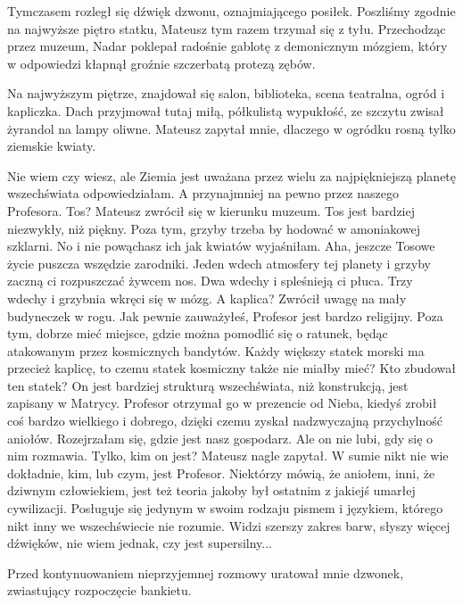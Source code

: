 Tymczasem rozległ się dźwięk dzwonu, oznajmiającego posiłek.
Poszliśmy zgodnie na najwyższe piętro statku, Mateusz tym razem trzymał się z tyłu.
Przechodząc przez muzeum, Nadar poklepał radośnie gablotę z demonicznym mózgiem, który w odpowiedzi kłapnął groźnie szczerbatą protezą zębów.

Na najwyższym piętrze, znajdował się salon, biblioteka, scena teatralna, ogród i kapliczka.
Dach przyjmował tutaj miłą, półkulistą wypukłość, ze szczytu zwisał żyrandol na lampy oliwne.
Mateusz zapytał mnie, dlaczego w ogródku rosną tylko ziemskie kwiaty.

\begin{dialogue}
\ds{} Nie wiem czy wiesz, ale Ziemia jest uważana przez wielu za najpiękniejszą planetę wszechświata \dm{} odpowiedziałam. \dm{}
A przynajmniej na pewno przez naszego Profesora.
\ds{} Tos? \dm{} Mateusz zwrócił się w kierunku muzeum.
\ds{} Tos jest bardziej niezwykły, niż piękny. Poza tym, grzyby trzeba by hodować w amoniakowej szklarni.
No i nie powąchasz ich jak kwiatów \ds{} wyjaśniłam. \dm{} Aha, jeszcze Tosowe życie puszcza wszędzie zarodniki. 
Jeden wdech atmosfery tej planety i grzyby zaczną ci rozpuszczać żywcem nos. Dwa wdechy i spleśnieją ci płuca. Trzy wdechy i grzybnia wkręci się w mózg.
\ds{} A kaplica? \dm{} Zwrócił uwagę na mały budyneczek w rogu.
\ds{} Jak pewnie zauważyłeś, Profesor jest bardzo religijny. Poza tym, dobrze mieć miejsce, gdzie można pomodlić się o ratunek, będąc atakowanym przez kosmicznych bandytów. 
Każdy większy statek morski ma przecież kaplicę, to czemu statek kosmiczny także nie miałby mieć? 
\ds{} Kto zbudował ten statek?
\ds{} On jest bardziej strukturą wszechświata, niż konstrukcją, jest zapisany w Matrycy. 
Profesor otrzymał go w prezencie od Nieba, kiedyś zrobił coś bardzo wielkiego i dobrego, dzięki czemu zyskał nadzwyczajną przychylność aniołów. \dm{}
Rozejrzałam się, gdzie jest nasz gospodarz. \dm{}
Ale on nie lubi, gdy się o nim rozmawia.
\ds{} Tylko, kim on jest? \dm{} Mateusz nagle zapytał.
\ds{} W sumie nikt nie wie dokładnie, kim, lub czym, jest Profesor. 
Niektórzy mówią, że aniołem, inni, że dziwnym człowiekiem,
jest też teoria jakoby był ostatnim z jakiejś umarłej cywilizacji. 
Posługuje się jedynym w swoim rodzaju pismem i językiem, którego nikt inny we wszechświecie nie rozumie.
Widzi szerszy zakres barw, słyszy więcej dźwięków, nie wiem jednak, czy jest supersilny...
\end{dialogue}

Przed kontynuowaniem nieprzyjemnej rozmowy uratował mnie dzwonek, zwiastujący rozpoczęcie bankietu.

